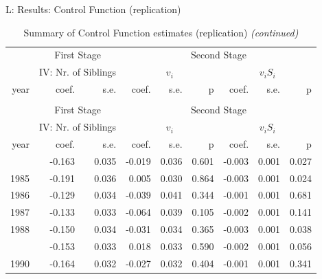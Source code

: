 \documentclass[10pt,ignorenonframetext,]{beamer}
\begin{document}
\begin{frame}{L: Results: Control Function (replication)}
\protect\hypertarget{l-results-control-function-replication}{}

\begingroup\fontsize{7}{9}\selectfont

\begin{longtable}[t]{rrrrrrrrr}
\caption{\label{tab:unnamed-chunk-2}Summary of Control Function estimates (replication)}\\
\toprule
\multicolumn{1}{c}{ } & \multicolumn{2}{c}{First Stage} & \multicolumn{6}{c}{Second Stage} \\
\cmidrule(l{2pt}r{2pt}){2-3} \cmidrule(l{2pt}r{2pt}){4-9}
\multicolumn{1}{c}{ } & \multicolumn{2}{c}{IV: Nr. of Siblings} & \multicolumn{3}{c}{$v_i$} & \multicolumn{3}{c}{$v_i S_i$} \\
\cmidrule(l{2pt}r{2pt}){2-3} \cmidrule(l{2pt}r{2pt}){4-6} \cmidrule(l{2pt}r{2pt}){7-9}
year & coef. & s.e. & coef. & s.e. & p & coef. & s.e. & p\\
\midrule
\endfirsthead
\caption[]{Summary of Control Function estimates (replication) \textit{(continued)}}\\
\toprule
\multicolumn{1}{c}{ } & \multicolumn{2}{c}{First Stage} & \multicolumn{6}{c}{Second Stage} \\
\cmidrule(l{2pt}r{2pt}){2-3} \cmidrule(l{2pt}r{2pt}){4-9}
\multicolumn{1}{c}{ } & \multicolumn{2}{c}{IV: Nr. of Siblings} & \multicolumn{3}{c}{$v_i$} & \multicolumn{3}{c}{$v_i S_i$} \\
\cmidrule(l{2pt}r{2pt}){2-3} \cmidrule(l{2pt}r{2pt}){4-6} \cmidrule(l{2pt}r{2pt}){7-9}
year & coef. & s.e. & coef. & s.e. & p & coef. & s.e. & p\\
\midrule
\endhead
\
\endfoot
\bottomrule
\endlastfoot
1984 & -0.163 & 0.035 & -0.019 & 0.036 & 0.601 & -0.003 & 0.001 & 0.027\\
1985 & -0.191 & 0.036 & 0.005 & 0.030 & 0.864 & -0.003 & 0.001 & 0.024\\
1986 & -0.129 & 0.034 & -0.039 & 0.041 & 0.344 & -0.001 & 0.001 & 0.681\\
1987 & -0.133 & 0.033 & -0.064 & 0.039 & 0.105 & -0.002 & 0.001 & 0.141\\
1988 & -0.150 & 0.034 & -0.031 & 0.034 & 0.365 & -0.003 & 0.001 & 0.038\\
\addlinespace
1989 & -0.153 & 0.033 & 0.018 & 0.033 & 0.590 & -0.002 & 0.001 & 0.056\\
1990 & -0.164 & 0.032 & -0.027 & 0.032 & 0.404 & -0.001 & 0.001 & 0.341\\

\end{longtable}
\end{frame}
\end{document}
